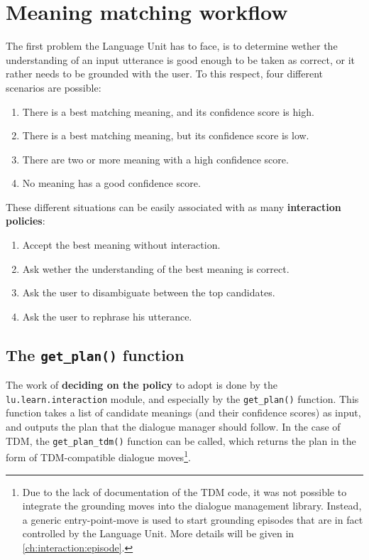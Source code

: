 \section{Meaning matching workflow} \label{ch:interaction:mmw}
The first problem the Language Unit has to face, is to determine wether the understanding of an input utterance is good enough to be taken as correct, or it rather needs to be grounded with the user. To this respect, four different scenarios are possible:
\begin{enumerate}
	\item There is a best matching meaning, and its confidence score is high.
	\item There is a best matching meaning, but its confidence score is low.
	\item There are two or more meaning with a high confidence score.
	\item No meaning has a good confidence score.
\end{enumerate}
These different situations can be easily associated with as many \textbf{interaction policies}:
\begin{enumerate}
	\item Accept the best meaning without interaction.
	\item Ask wether the understanding of the best meaning is correct.
	\item Ask the user to disambiguate between the top candidates.
	\item Ask the user to rephrase his utterance.
\end{enumerate}

\subsection{The \texttt{get\_plan()} function} \label{ch:interaction:mmw:getplan}
The work of \textbf{deciding on the policy} to adopt is done by the \texttt{lu.learn.interaction} module, and especially by the \texttt{get\_plan()} function. This function takes a list of candidate meanings (and their confidence scores) as input, and outputs the plan that the dialogue manager should follow. In the case of TDM, the \texttt{get\_plan\_tdm()} function can be called, which returns the plan in the form of TDM-compatible dialogue moves\footnote{Due to the lack of documentation of the TDM code, it was not possible to integrate the grounding moves into the dialogue management library. Instead, a generic entry-point-move is used to start grounding episodes that are in fact controlled by the Language Unit. More details will be given in \ref{ch:interaction:episode}.}.

